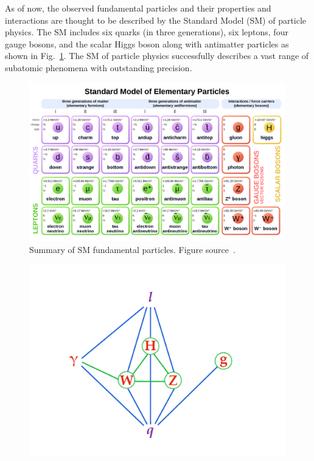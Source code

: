 As of now, the observed fundamental particles and their properties and interactions are thought to be described by the Standard Model (SM) of particle physics.
The SM includes six quarks (in three generations), six leptons, four gauge bosons, and the scalar Higgs boson along with antimatter particles as shown in Fig.~\ref{fig:SMParticles}.
The SM of particle physics successfully describes a vast range of subatomic phenomena with outstanding precision.

\begin{figure}[t!]
\centering
\includegraphics[width=0.99\textwidth]{figures/SMtable.png}
\caption[Summary of standard model fundamental particles]{Summary of SM fundamental particles. Figure source~\cite{SMtable}.
\label{fig:SMParticles}}
\end{figure}


\begin{figure}[t!]
\centering
\includegraphics[width=0.99\textwidth]{figures/SM_coupling.png}
\caption[interactions between fundamental particles]{
\label{fig:SMcoupling}}
\end{figure}

